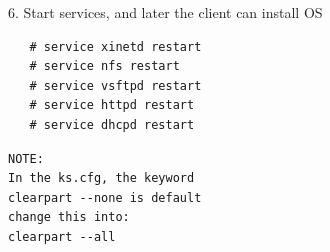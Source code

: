 6. Start services, and later the client can install OS

\small{
\begin{verbatim}
   # service xinetd restart
   # service nfs restart
   # service vsftpd restart
   # service httpd restart
   # service dhcpd restart
\end{verbatim}
}
\normalsize

\begin{verbatim}
NOTE:
In the ks.cfg, the keyword 
clearpart --none is default
change this into:
clearpart --all
\end{verbatim}

